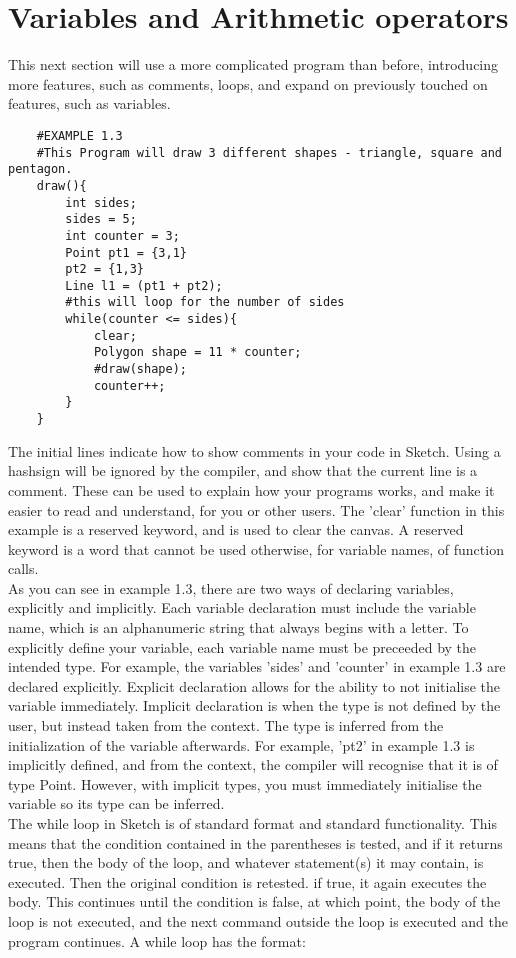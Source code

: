 \documentclass{l3proj}
\begin{document}
\section{Variables and Arithmetic operators}
\label{vars}
This next section will use a more complicated program than before, introducing more features, such as comments, loops, and expand on previously touched on features, such as variables.
\begin{verbatim}
    #EXAMPLE 1.3
    #This Program will draw 3 different shapes - triangle, square and pentagon.
    draw(){
        int sides;
        sides = 5;
        int counter = 3;
        Point pt1 = {3,1}
        pt2 = {1,3}
        Line l1 = (pt1 + pt2);
        #this will loop for the number of sides
        while(counter <= sides){
            clear;
            Polygon shape =	11 * counter;
            #draw(shape);
            counter++;
        }
    }
\end{verbatim}
The initial lines indicate how to show comments in your code in Sketch. Using a hashsign will be ignored by the compiler, and show that the current line is a comment. These can be used to explain how your programs works, and make it easier to read and understand, for you or other users. The 'clear' function in this example is a reserved keyword, and is used to clear the canvas. A reserved keyword is a word that cannot be used otherwise, for variable names, of function calls.
\\ [12pt]
As you can see in example 1.3, there are two ways of declaring variables, explicitly and implicitly. Each variable declaration must include the variable name, which is an alphanumeric string that always begins with a letter. To explicitly define your variable, each variable name must be preceeded by the intended type. For example, the variables 'sides' and 'counter' in example 1.3 are declared explicitly. Explicit declaration allows for the ability to not initialise the variable immediately. Implicit declaration is when the type is not defined by the user, but instead taken from the context. The type is inferred from the initialization of the variable afterwards. For example, 'pt2' in example 1.3 is implicitly defined, and from the context, the compiler will recognise that it is of type Point. However, with implicit types, you must immediately initialise the variable so its type can be inferred.
\\ [12pt]
The while loop in Sketch is of standard format and standard functionality. This means that the condition contained in the parentheses is tested, and if it returns true, then the body of the loop, and whatever statement(s) it may contain, is executed. Then the original condition is retested. if true, it again executes the body. This continues until the condition is false, at which point, the body of the loop is not executed, and the next command outside the loop is executed and the program continues. A while loop has the format: 
\end{document}
